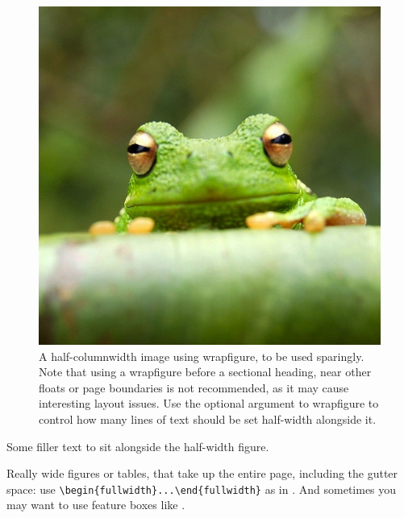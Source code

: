 \documentclass[9pt,lineno]{elife}
\begin{document}
\begin{figure}
\includegraphics[width=\hsize]{frog}
\caption{A half-columnwidth image using wrapfigure, to be used sparingly. Note that using a wrapfigure before a sectional heading, near other floats or page boundaries is not recommended, as it may cause interesting layout issues. Use the optional argument to wrapfigure to control how many lines of text should be set half-width alongside it.}
\label{fig:halfwidth}
\end{figure}

Some filler text to sit alongside the half-width figure. \lipsum[1] \lipsum[2]

Really wide figures or tables, that take up the entire page, including the gutter space: use \verb|\begin{fullwidth}...\end{fullwidth}| as in . And sometimes you may want to use feature boxes like .
\end{document}
